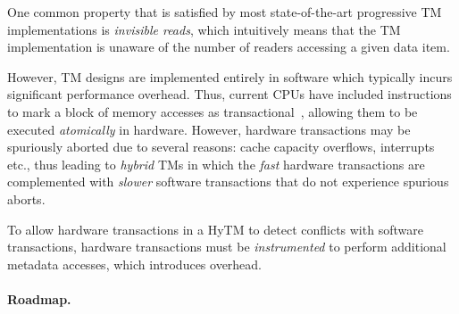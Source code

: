 One common property that is satisfied by most state-of-the-art progressive TM implementations is \emph{invisible reads},
which intuitively means that the TM implementation is unaware of the number of readers accessing a given data item.

However, TM designs are implemented entirely in software which typically incurs significant performance overhead.
Thus, current CPUs have included instructions to mark a block of memory accesses as transactional~\cite{Rei12, asf, bluegene}, allowing them to be executed \emph{atomically} in hardware.
However, hardware transactions may be spuriously aborted due to several reasons: cache capacity overflows, interrupts etc., thus leading to \emph{hybrid} TMs 
in which the \emph{fast} hardware transactions are complemented with \emph{slower} software transactions that do not experience spurious aborts.

To allow hardware transactions in a HyTM to detect conflicts with software transactions, 
hardware transactions must be \emph{instrumented} to perform additional metadata accesses, which introduces overhead.

\paragraph{Roadmap.}